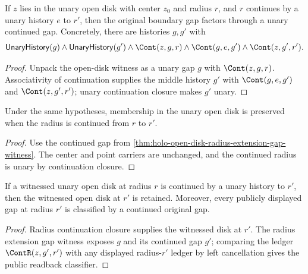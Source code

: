 \begin{theorem}
\label{thm:holo-open-disk-radius-extension-gap-witness}
If \(z\) lies in the unary open disk with center \(z_0\) and radius \(r\), and
\(r\) continues by a unary history \(e\) to \(r'\), then the original boundary
gap factors through a unary continued gap. Concretely, there are histories
\(g,g'\) with
$$
\mathsf{UnaryHistory}(g)\land\mathsf{UnaryHistory}(g')\land
\Cont(z,g,r)\land\Cont(g,e,g')\land\Cont(z,g',r').
$$
\end{theorem}
\begin{proof}
Unpack the open-disk witness as a unary gap \(g\) with \(\Cont(z,g,r)\).
Associativity of continuation supplies the middle history \(g'\) with
\(\Cont(g,e,g')\) and \(\Cont(z,g',r')\); unary continuation closure makes
\(g'\) unary.
\end{proof}

\begin{theorem}
\label{thm:holo-open-disk-radius-continuation-extend}
Under the same hypotheses, membership in the unary open disk is preserved when
the radius is continued from \(r\) to \(r'\).
\end{theorem}
\begin{proof}
Use the continued gap from
\autoref{thm:holo-open-disk-radius-extension-gap-witness}. The center and point
carriers are unchanged, and the continued radius is unary by continuation
closure.
\end{proof}

\begin{theorem}
\label{thm:holo-open-disk-witnessed-radius-extension-gap-public-readback}
If a witnessed unary open disk at radius \(r\) is continued by a unary history
to \(r'\), then the witnessed open disk at \(r'\) is retained. Moreover, every
publicly displayed gap at radius \(r'\) is classified by a continued original
gap.
\end{theorem}
\begin{proof}
Radius continuation closure supplies the witnessed disk at \(r'\). The radius
extension gap witness exposes \(g\) and its continued gap \(g'\); comparing the
ledger \(\ContR(z,g',r')\) with any displayed radius-\(r'\) ledger by left
cancellation gives the public readback classifier.
\end{proof}

